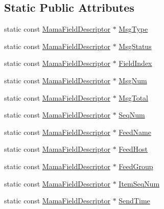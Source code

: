 \subsection*{Static Public Attributes}
\begin{DoxyCompactItemize}
\item 
static const \hyperlink{classWombat_1_1MamaFieldDescriptor}{MamaFieldDescriptor} $\ast$ \hyperlink{classWombat_1_1MamaReservedFields_a0819e9809452d6e67b71b12e3a6b1e04}{MsgType}
\item 
static const \hyperlink{classWombat_1_1MamaFieldDescriptor}{MamaFieldDescriptor} $\ast$ \hyperlink{classWombat_1_1MamaReservedFields_ac3d37bfc45c2ea9786476c37781571ab}{MsgStatus}
\item 
static const \hyperlink{classWombat_1_1MamaFieldDescriptor}{MamaFieldDescriptor} $\ast$ \hyperlink{classWombat_1_1MamaReservedFields_acf0bd2fbf45d1792d39fbc2479fdec3c}{FieldIndex}
\item 
static const \hyperlink{classWombat_1_1MamaFieldDescriptor}{MamaFieldDescriptor} $\ast$ \hyperlink{classWombat_1_1MamaReservedFields_aeb9b392a9e079c24bc8bab62a7bfbe29}{MsgNum}
\item 
static const \hyperlink{classWombat_1_1MamaFieldDescriptor}{MamaFieldDescriptor} $\ast$ \hyperlink{classWombat_1_1MamaReservedFields_a5841ad281f62828e4e461fd6a239e3af}{MsgTotal}
\item 
static const \hyperlink{classWombat_1_1MamaFieldDescriptor}{MamaFieldDescriptor} $\ast$ \hyperlink{classWombat_1_1MamaReservedFields_a4ccb10675e66a43a0753ba8ae86d60af}{SeqNum}
\item 
static const \hyperlink{classWombat_1_1MamaFieldDescriptor}{MamaFieldDescriptor} $\ast$ \hyperlink{classWombat_1_1MamaReservedFields_ae8edeace5cbadeb3c535d2a315cf686d}{FeedName}
\item 
static const \hyperlink{classWombat_1_1MamaFieldDescriptor}{MamaFieldDescriptor} $\ast$ \hyperlink{classWombat_1_1MamaReservedFields_a5cc1bb9f8caaed80fdf48947d3b0a910}{FeedHost}
\item 
static const \hyperlink{classWombat_1_1MamaFieldDescriptor}{MamaFieldDescriptor} $\ast$ \hyperlink{classWombat_1_1MamaReservedFields_a231c3d6b7d2f383fa81be2bba70b5fd8}{FeedGroup}
\item 
static const \hyperlink{classWombat_1_1MamaFieldDescriptor}{MamaFieldDescriptor} $\ast$ \hyperlink{classWombat_1_1MamaReservedFields_a4cb8b07962564bf008aa8dcbebec4e67}{ItemSeqNum}
\item 
static const \hyperlink{classWombat_1_1MamaFieldDescriptor}{MamaFieldDescriptor} $\ast$ \hyperlink{classWombat_1_1MamaReservedFields_a6cdadb672b0797858428ffe8a8bffdb8}{SendTime}

\end{DoxyCompactItemize}
